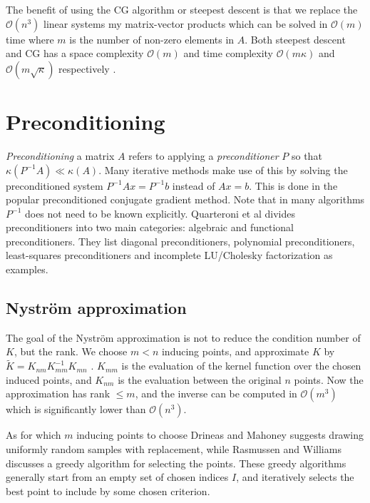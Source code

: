 \documentclass{article}
\theoremstyle{plain}
\theoremstyle{definition}
\theoremstyle{remark}
\begin{document}
The benefit of using the CG algorithm or steepest descent is that we replace the $\mathcal{O}(n^3)$ linear systems my matrix-vector products which can be solved in $\mathcal{O}(m)$ time where $m$ is the number of non-zero elements in $A$.
Both steepest descent and CG has a space complexity $\mathcal{O}(m)$ and time complexity $\mathcal{O}(m \kappa)$ and $\mathcal{O} (m \sqrt{\kappa})$ respectively \cite{shewchuk}.

\section{Preconditioning}
\textit{Preconditioning} a matrix $A$ refers to applying a \textit{preconditioner} $P$ so that $\kappa(P^{-1}A) \ll \kappa(A)$. \cite{cutajar}
Many iterative methods make use of this by solving the preconditioned system $P^{-1}Ax = P^{-1}b$ instead of $Ax = b$.
This is done in the popular preconditioned conjugate gradient method.
Note that in many algorithms $P^{-1}$ does not need to be known explicitly.
Quarteroni et al \cite{quarteroni} divides preconditioners into two main categories: algebraic and functional preconditioners. They list diagonal preconditioners, polynomial preconditioners, least-squares preconditioners and incomplete LU/Cholesky factorization as examples.

\subsection{Nyström approximation}
The goal of the Nyström approximation is not to reduce the condition number of $K$, but the rank.
We choose $m < n$ inducing points, and approximate $K$ by $\tilde{K}  = K_{nm}K_{mm}^{-1}K_{mn}$ \cite{rasmussen}.
$K_{mm}$ is the evaluation of the kernel function over the chosen induced points, and $K_{nm}$ is the evaluation between the original $n$ points.
Now the approximation has rank $\leq m$, and the inverse can be computed in $\mathcal{O}(m^3)$ which is significantly lower than $\mathcal{O}(n^3)$.

As for which $m$ inducing points to choose Drineas and Mahoney \cite{drineas} suggests drawing uniformly random samples with replacement, while Rasmussen and Williams discusses a greedy algorithm for selecting the points.
These greedy algorithms generally start from an empty set of chosen indices $I$, and iteratively selects the best point to include by some chosen criterion.
\end{document}

